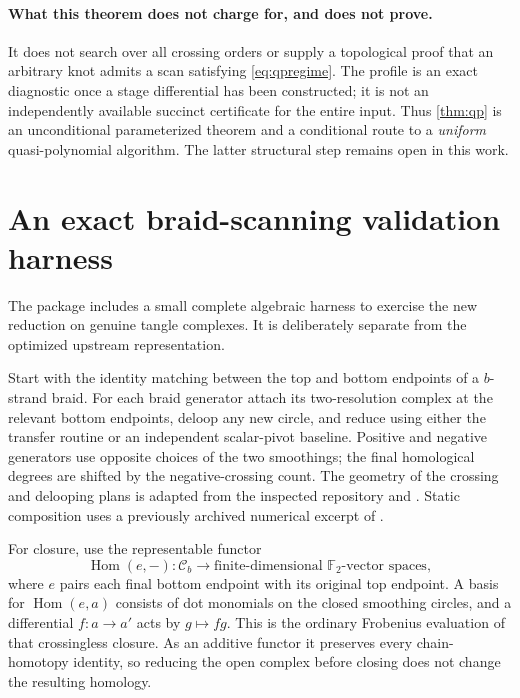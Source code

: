 \documentclass[11pt,letterpaper]{article}
\theoremstyle{definition}
\theoremstyle{remark}
\newcommand{\F}{\mathbb F_2}
\newcommand{\C}{\mathcal C}
\newcommand{\Hom}{\operatorname{Hom}}
\newcommand{\code}[1]{\texttt{\detokenize{#1}}}
\begin{document}
\paragraph{What this theorem does not charge for, and does not prove.}
It does not search over all crossing orders or supply a topological proof that
an arbitrary knot admits a scan satisfying \cref{eq:qpregime}. The profile is
an exact diagnostic once a stage differential has been constructed; it is not
an independently available succinct certificate for the entire input. Thus
\cref{thm:qp} is an unconditional parameterized theorem and a conditional
route to a \emph{uniform} quasi-polynomial algorithm. The latter structural
step remains open in this work.

\section{An exact braid-scanning validation harness}
\label{sec:braid}
The package includes a small complete algebraic harness to exercise the new
reduction on genuine tangle complexes. It is deliberately separate from the
optimized upstream \code{FastScan} representation.

Start with the identity matching between the top and bottom endpoints of a
$b$-strand braid. For each braid generator attach its two-resolution complex
at the relevant bottom endpoints, deloop any new circle, and reduce using
either the transfer routine or an independent scalar-pivot baseline.
Positive and negative generators use opposite choices of the two smoothings;
the final homological degrees are shifted by the negative-crossing count.
The geometry of the crossing and delooping plans is adapted from the inspected
repository \code{geometry.py} and \code{algebra.py}. Static composition uses
a previously archived numerical excerpt of \code{planar.py}.

For closure, use the representable functor
\[
 \Hom(e,-):\C_b\longrightarrow\text{finite-dimensional }\F\text{-vector spaces},
\]
where $e$ pairs each final bottom endpoint with its original top endpoint.
A basis for $\Hom(e,a)$ consists of dot monomials on the closed smoothing
circles, and a differential $f:a\to a'$ acts by $g\mapsto fg$.
This is the ordinary Frobenius evaluation of that crossingless closure.
As an additive functor it preserves every chain-homotopy identity, so reducing
the open complex before closing does not change the resulting homology.
\end{document}

